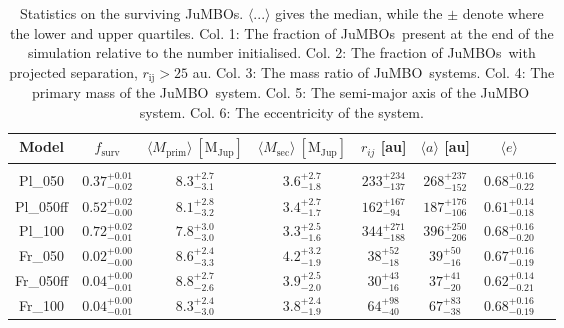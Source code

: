 \documentclass[submission,phys]{lib/SciPost}
\newcommand{\jumbo}{\mbox{JuMBO}}
\newcommand{\jumbos}{\mbox{JuMBOs}}
\begin{document}
\begin{table}
         \caption{Statistics on the surviving \jumbos. $\langle
           ...\rangle$ gives the median, while the $\pm$ denote where
           the lower and upper quartiles. Col. 1: The fraction of
           \jumbos\, present at the end of the simulation relative to
           the number initialised. Col. 2: The fraction of \jumbos\,
           with projected separation, $r_{\mathrm{ij}} > 25$
           au. Col. 3: The mass ratio of \jumbo\, systems. Col. 4: The
           primary mass of the \jumbo\, system. Col. 5: The semi-major
           axis of the \jumbo\, system. Col. 6: The eccentricity of
           the system.
           }
        \label{Tab:SF_Res}
        \centering 
        \begin{tabular}{c c c c c c c c}
        \hline\hline
        Model & $f_{\mathrm{surv}}$ & $\langle M_{\mathrm{prim}} \rangle\ [\mathrm{M_{\mathrm{Jup}}}]$ & $\langle M_{\mathrm{sec}} \rangle\ [\mathrm{M_{\mathrm{Jup}}}]$ & $r_{ij}$ [au] &$\langle a \rangle$ [au] & $\langle e \rangle$\\
        \hline \vspace{-0.75em}\\ 
           Pl\_050     & $0.37^{+0.01}_{-0.02}$ & $8.3^{+2.7}_{-3.1}$ & $3.6^{+2.7}_{-1.8}$ & $233^{+234}_{-137}$ & $268^{+237}_{-152}$ & $0.68^{+0.16}_{-0.22}$ \vspace{0.25em}\\
           Pl\_050ff   & $0.52^{+0.02}_{-0.00}$ & $8.1^{+2.8}_{-3.2}$ & $3.4^{+2.7}_{-1.7}$ & $162^{+167}_{-94}$ & $187^{+176}_{-106}$ & $0.61^{+0.14}_{-0.18}$ \vspace{0.25em}\\
           Pl\_100      & $0.72^{+0.02}_{-0.01}$ & $7.8^{+3.0}_{-3.0}$ & $3.3^{+2.5}_{-1.6}$ & $344^{+271}_{-188}$ & $396^{+250}_{-206}$ & $0.68^{+0.16}_{-0.20}$ \vspace{0.25em}\\
           Fr\_050     & $0.02^{+0.00}_{-0.00}$ & $8.6^{+2.4}_{-3.3}$ & $4.2^{+3.2}_{-1.9}$ & $38^{+52}_{-18}$ & $39^{+50}_{-16}$ & $0.67^{+0.16}_{-0.19}$ \vspace{0.25em}\\
           Fr\_050ff   & $0.04^{+0.00}_{-0.01}$ & $8.8^{+2.7}_{-2.6}$ & $3.9^{+2.5}_{-2.0}$ & $30^{+43}_{-16}$ & $37^{+41}_{-20}$ & $0.62^{+0.14}_{-0.21}$ \vspace{0.25em}\\
           Fr\_100      & $0.04^{+0.00}_{-0.01}$ & $8.3^{+2.4}_{-3.0}$ & $3.8^{+2.4}_{-1.9}$ & $64^{+98}_{-40}$ & $67^{+83}_{-38}$ & $0.68^{+0.16}_{-0.19}$ \vspace{0.25em}\\

\end{tabular}
\end{table}
\end{document}
